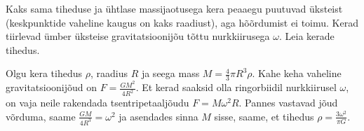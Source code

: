 
Kaks sama tiheduse ja ühtlase massijaotusega kera peaaegu puutuvad üksteist (keskpunktide vaheline kaugus on kaks raadiust), aga hõõrdumist ei toimu. Kerad tiirlevad ümber üksteise gravitatsioonijõu tõttu nurkkiirusega $\omega$. Leia kerade tihedus.




\hint

\solu
Olgu kera tihedus $\rho$, raadius $R$ ja seega mass $M = \frac{4}{3}\pi R^3 \rho$. Kahe keha vaheline gravitatsioonijõud on $F = \frac{G M^2}{4R^2}$. Et kerad saaksid olla ringorbiidil nurkkiirusel $\omega$, on vaja neile rakendada tsentripetaaljõudu $F = M \omega^2 R$. Pannes vastavad jõud võrduma, saame $\frac{G M}{4 R^3} = \omega^2$ ja asendades sinna $M$ sisse, saame, et tihedus $\rho = \frac{3\omega^2}{\pi G}$.
\probend